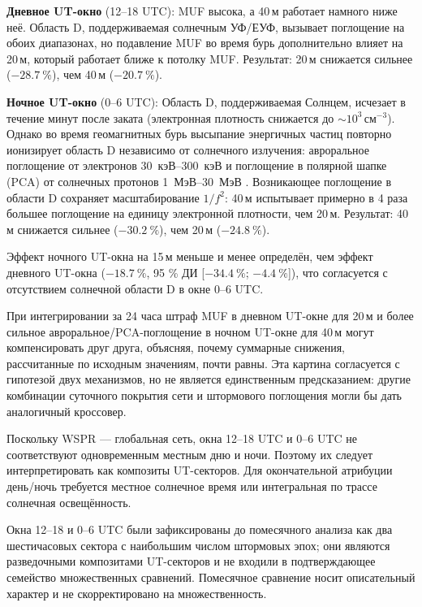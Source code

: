 \documentclass{agujournal2019}
\begin{document}
\textbf{Дневное UT-окно} (12--18 UTC): MUF высока, а 40\,м работает намного ниже
неё. Область D, поддерживаемая солнечным УФ/ЕУФ, вызывает поглощение на обоих
диапазонах, но подавление MUF во время бурь дополнительно влияет на 20\,м,
который работает ближе к потолку MUF. Результат: 20\,м снижается сильнее
($\SI{-28.7}{\percent}$), чем 40\,м ($\SI{-20.7}{\percent}$).

\textbf{Ночное UT-окно} (0--6 UTC): Область D, поддерживаемая Солнцем, исчезает
в течение минут после заката (электронная плотность снижается до
$\sim 10^3$\,см$^{-3}$). Однако во время геомагнитных бурь высыпание
энергичных частиц повторно ионизирует область D независимо от солнечного
излучения: авроральное поглощение от электронов \SIrange{30}{300}{\mbox{кэВ}}
\citep{hargreaves1969,royrvik1977} и поглощение в полярной шапке (PCA)
от солнечных протонов \SIrange{1}{30}{\mbox{МэВ}} \citep{reid1974}. Возникающее
поглощение в области D сохраняет масштабирование $1/f^2$: 40\,м испытывает
примерно в 4 раза большее поглощение на единицу электронной плотности,
чем 20\,м. Результат: 40\,м снижается сильнее ($\SI{-30.2}{\percent}$),
чем 20\,м ($\SI{-24.8}{\percent}$).

Эффект ночного UT-окна на 15\,м меньше и менее определён, чем эффект дневного UT-окна
($\SI{-18.7}{\percent}$, 95 \% ДИ
[$\SI{-34.4}{\percent}$; $\SI{-4.4}{\percent}$]), что согласуется
с отсутствием солнечной области D в окне 0--6 UTC.

При интегрировании за 24 часа штраф MUF в дневном UT-окне для 20\,м и более
сильное авроральное/PCA-поглощение в ночном UT-окне для 40\,м могут компенсировать
друг друга, объясняя, почему суммарные снижения,
рассчитанные по исходным значениям, почти равны.
Эта картина согласуется с гипотезой двух механизмов, но не является
единственным предсказанием: другие комбинации суточного покрытия сети
и штормового поглощения могли бы дать аналогичный кроссовер.

Поскольку WSPR — глобальная сеть, окна 12--18 UTC и 0--6 UTC не
соответствуют одновременным местным дню и ночи. Поэтому их следует
интерпретировать как композиты UT-секторов. Для окончательной атрибуции
день/ночь требуется местное солнечное время или интегральная по трассе
солнечная освещённость.

Окна 12--18 и 0--6 UTC были зафиксированы до помесячного анализа как два
шестичасовых сектора с наибольшим числом штормовых эпох; они являются
разведочными композитами UT-секторов и не входили в подтверждающее
семейство множественных сравнений. Помесячное сравнение носит описательный
характер и не скорректировано на множественность.
\end{document}
